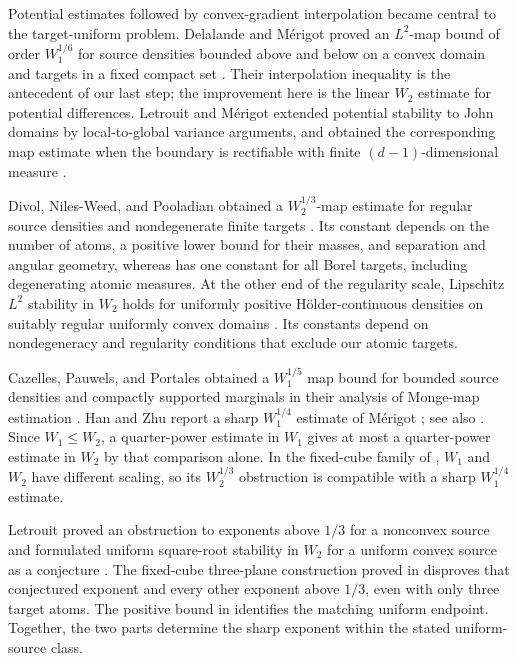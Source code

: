 Potential estimates followed by convex-gradient interpolation became
central to the target-uniform problem. Delalande and M\'erigot proved
an \(L^2\)-map bound of order \(W_1^{1/6}\) for source densities bounded
above and below on a convex domain and targets in a fixed compact set
\cite[Theorem~4.2]{DelalandeMerigot2023}. Their interpolation inequality
\cite[Proposition~4.1]{DelalandeMerigot2023} is the antecedent of our
last step; the improvement here is the linear \(W_2\) estimate for
potential differences. Letrouit and M\'erigot extended potential
stability to John domains by local-to-global variance arguments, and
obtained the corresponding map estimate when the boundary is
rectifiable with finite \((d-1)\)-dimensional measure
\cite[Theorem~1.7]{LetrouitMerigot2024}.

Divol, Niles-Weed, and Pooladian obtained a
\(W_2^{1/3}\)-map estimate for regular source densities and
nondegenerate finite targets
\cite[Theorem~4.3]{DivolNilesWeedPooladian2025}. Its constant depends on
the number of atoms, a positive lower bound for their masses, and
separation and angular geometry, whereas  has one
constant for all Borel targets, including degenerating atomic measures.
At the other end of the regularity scale, Lipschitz \(L^2\) stability
in \(W_2\) holds for uniformly positive H\"older-continuous densities
on suitably regular uniformly convex domains
\cite[Theorem~1.1]{CajaLopezDelgadinoKitagawa2026}. Its constants depend
on nondegeneracy and regularity conditions that exclude our atomic
targets.

Cazelles, Pauwels, and Portales obtained a \(W_1^{1/5}\) map bound for
bounded source densities and compactly supported marginals in their
analysis of Monge-map estimation
\cite[Corollary~4.9]{CazellesPauwelsPortales2026}.
Han and Zhu \cite[Proposition~2.7]{HanZhu2026} report a sharp
\(W_1^{1/4}\) estimate of M\'erigot \cite{Merigot2026}; see also
\cite[Section~2.3]{ChewiEichingerPooladian2026}. Since \(W_1\le W_2\),
a quarter-power estimate in \(W_1\) gives at most a quarter-power
estimate in \(W_2\) by that comparison alone. In the fixed-cube family
of , \(W_1\) and \(W_2\) have different scaling,
so its \(W_2^{1/3}\) obstruction is compatible with a sharp
\(W_1^{1/4}\) estimate.

Letrouit proved an obstruction to exponents above \(1/3\) for a
nonconvex source and formulated uniform square-root stability in \(W_2\)
for a uniform convex source as a conjecture
\cite[Theorem~2 and Conjecture~3]{Letrouit2026}. The fixed-cube
three-plane construction proved in  disproves
that conjectured exponent and every other exponent above \(1/3\), even
with only three target atoms. The positive bound in 
identifies the matching uniform endpoint. Together, the two parts
determine the sharp exponent within the stated uniform-source class.

